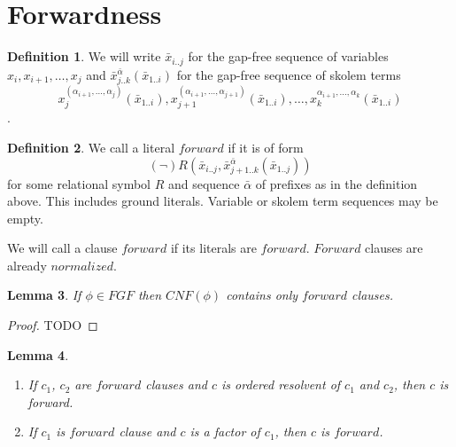 \documentclass[english, shortabstract]{iithesis}
\theoremstyle{definition} \newtheorem{definition}{Definition}[chapter]
\theoremstyle{remark} \newtheorem{remark}[definition]{Observation}
\theoremstyle{plain} \newtheorem{theorem}[definition]{Theorem}
\theoremstyle{plain} \newtheorem{lemma}[definition]{Lemma}
\begin{document}
\section{Forwardness}

\begin{definition}
We will write $\bar{x}_{i..j}$ for the gap-free sequence of variables $x_i, x_{i+1}, \dots, x_j$ and 
$\bar{x}^{\bar{\alpha}}_{j..k}(\bar{x}_{1..i})$ for the gap-free sequence of skolem terms $$x^{(\alpha_{i+1}, \dots, \alpha_j)}_{j}(\bar{x}_{1..i}), x^{(\alpha_{i+1}, \dots, \alpha_{j+1})}_{j+1}(\bar{x}_{1..i}), \dots, x^{\alpha_{i+1}, \dots, \alpha_k}_k(\bar{x}_{1..i})$$.
\end{definition}

\begin{definition}
We call a literal $forward$ if it is of form
$$(\lnot)R(\bar{x}_{i..j}, \bar{x}^{\bar{\alpha}}_{{j+1..k}}(\bar{x}_{1..j}))$$
for some relational symbol $R$ and sequence $\bar{\alpha}$ of prefixes as in the definition above.
This includes ground literals. Variable or skolem term sequences may be empty.
\end{definition}

We will call a clause $forward$ if its literals are $forward$. $Forward$ clauses are already $normalized$.

\begin{lemma}
If $\phi \in FGF$ then $CNF(\phi)$ contains only $forward$ clauses.
\end{lemma}

\begin{proof}
TODO
\end{proof}

\begin{lemma}
\begin{enumerate}
    \item If $c_1$, $c_2$ are $forward$ clauses and $c$ is ordered resolvent of $c_1$ and $c_2$, then $c$ is forward.
    \item If $c_1$ is $forward$ clause and $c$ is a factor of $c_1$, then $c$ is $forward$.  
\end{enumerate}
\end{lemma}
\end{document}
